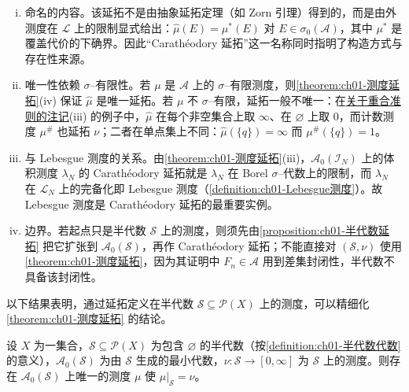 \documentclass[../../main.tex]{subfiles}%
\begin{document}
\begin{remark}\label{remark:ch01-Caratheodory延拓}
\begin{enumerate}[(i)]
\item 命名的内容。该延拓不是由抽象延拓定理（如 Zorn 引理）得到的，而是由外测度在 $\mathcal{L}$ 上的限制显式给出：$\widehat{\mu}(E)=\mu^*(E)$ 对 $E\in\sigma_0(\mathcal{A})$，其中 $\mu^*$ 是覆盖代价的下确界。因此“Carathéodory 延拓”这一名称同时指明了构造方式与存在性来源。
\item 唯一性依赖 $\sigma$--有限性。若 $\mu$ 是 $\mathcal{A}$ 上的 $\sigma$--有限测度，则\cref{theorem:ch01-测度延拓}(iv) 保证 $\widehat{\mu}$ 是唯一延拓。若 $\mu$ 不 $\sigma$--有限，延拓一般不唯一：在\hyperref[remark:ch01-重合准则]{关于重合准则的注记}(iii) 的例子中，$\widehat{\mu}$ 在每个非空集合上取 $\infty$、在 $\varnothing$ 上取 $0$，而计数测度 $\mu^{\#}$ 也延拓 $\nu$；二者在单点集上不同：$\widehat{\mu}(\{q\})=\infty$ 而 $\mu^{\#}(\{q\})=1$。
\item 与 Lebesgue 测度的关系。由\cref{theorem:ch01-测度延拓}(iii)，$\mathcal{A}_0(\mathcal{I}_N)$ 上的体积测度 $\lambda_N$ 的 Carathéodory 延拓就是 $\lambda_N$ 在 Borel $\sigma$--代数上的限制，而 $\lambda_N$ 在 $\mathcal{L}_N$ 上的完备化即 Lebesgue 测度（\cref{definition:ch01-Lebesgue测度}）。故 Lebesgue 测度是 Carathéodory 延拓的最重要实例。
\item 边界。若起点只是半代数 $\mathcal{S}$ 上的测度，则须先由\cref{proposition:ch01-半代数延拓} 把它扩张到 $\mathcal{A}_0(\mathcal{S})$，再作 Carathéodory 延拓；不能直接对 $(\mathcal{S},\nu)$ 使用\cref{theorem:ch01-测度延拓}，因为其证明中 $F_n\in\mathcal{A}$ 用到差集封闭性，半代数不具备该封闭性。
\end{enumerate}
\end{remark}

以下结果表明，通过延拓定义在半代数 $\mathcal{S}\subseteq\mathcal{P}(X)$ 上的测度，可以精细化\cref{theorem:ch01-测度延拓} 的结论。

\begin{proposition}\label{proposition:ch01-半代数延拓}
设 $X$ 为一集合，$\mathcal{S}\subseteq\mathcal{P}(X)$ 为包含 $\varnothing$ 的半代数（按\cref{definition:ch01-半代数代数} 的意义），$\mathcal{A}_0(\mathcal{S})$ 为由 $\mathcal{S}$ 生成的最小代数，$\nu:\mathcal{S}\to[0,\infty]$ 为 $\mathcal{S}$ 上的测度。则存在 $\mathcal{A}_0(\mathcal{S})$ 上唯一的测度 $\mu$ 使 $\mu|_{\mathcal{S}}=\nu$。
\end{proposition}
\end{document}
